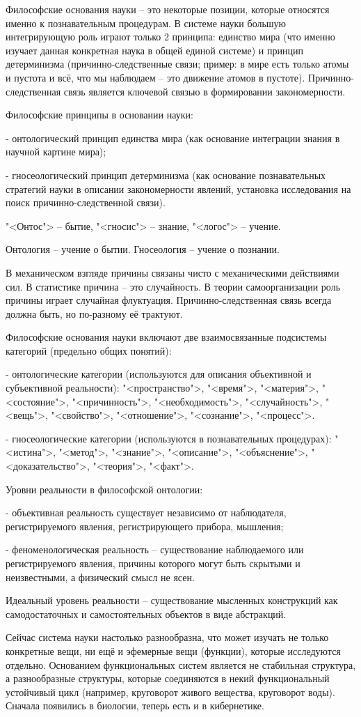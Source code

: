 \documentclass[exam_answers.tex]{subfiles}
\begin{document}

Философские основания науки – это некоторые позиции, которые относятся именно к познавательным процедурам. В системе науки большую интегрирующую роль играют только 2 принципа: единство мира (что именно изучает данная конкретная наука в общей единой системе) и принцип детерминизма (причинно-следственные связи; пример: в мире есть только атомы и пустота и всё, что мы наблюдаем – это движение атомов в пустоте). Причинно-следственная связь является ключевой связью в формировании закономерности.

Философские принципы в основании науки:

- онтологический принцип единства мира (как основание интеграции знания в научной картине мира);

- гносеологический принцип детерминизма (как основание познавательных стратегий науки в описании закономерности явлений, установка исследования на поиск причинно-следственной связи).

"<Онтос"> -- бытие, "<гносис"> -- знание, "<логос"> -- учение.

Онтология – учение о бытии. Гносеология – учение о познании.

В механическом взгляде причины связаны чисто с механическими действиями сил. В статистике причина – это случайность. В теории самоорганизации роль причины играет случайная флуктуация. Причинно-следственная связь всегда должна быть, но по-разному её трактуют.

Философские основания науки включают две взаимосвязанные подсистемы категорий (предельно общих понятий):

- онтологические категории (используются для описания объективной и субъективной реальности): "<пространство">, "<время">, "<материя">, "<состояние">, "<причинность">, "<необходимость">, "<случайность">, "<вещь">, "<свойство">, "<отношение">, "<сознание">, "<процесс">.

- гносеологические категории (используются в познавательных процедурах): "<истина">, "<метод">, "<знание">, "<описание">, "<объяснение">, "<доказательство">, "<теория">, "<факт">.

Уровни реальности в философской онтологии:

- объективная реальность существует независимо от наблюдателя, регистрируемого явления, регистрирующего прибора, мышления;

- феноменологическая реальность – существование наблюдаемого или регистрируемого явления, причины которого могут быть скрытыми и неизвестными, а физический смысл не ясен.

Идеальный уровень реальности – существование мысленных конструкций как самодостаточных и самостоятельных объектов в виде абстракций.

Сейчас система науки настолько разнообразна, что может изучать не только конкретные вещи, ни ещё и эфемерные вещи (функции), которые исследуются отдельно.
Основанием функциональных систем является не стабильная структура, а разнообразные структуры, которые соединяются в некий функциональный устойчивый цикл (например, круговорот живого вещества, круговорот воды).
Сначала появились в биологии, теперь есть и в кибернетике.
\end{document}
